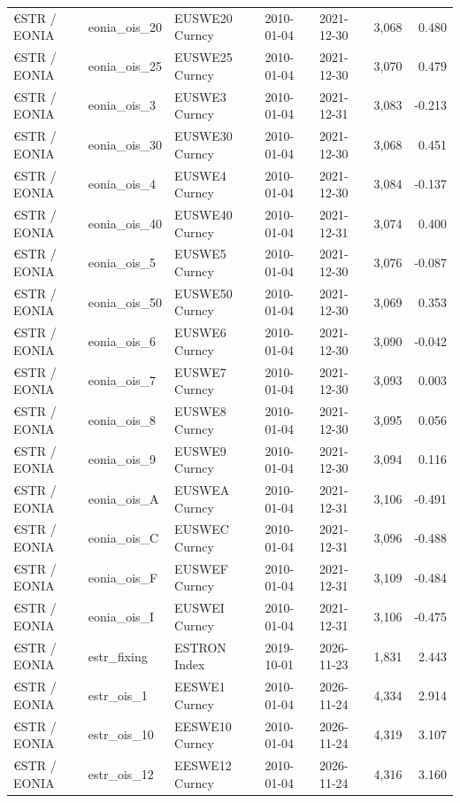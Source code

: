 \documentclass[10pt,a4paper]{article}
\begin{document}
{\begin{longtable}{lllllrr}
€STR / EONIA & eonia\_ois\_20 & EUSWE20 Curncy & 2010-01-04 & 2021-12-30 & 3,068 & 0.480 \\
€STR / EONIA & eonia\_ois\_25 & EUSWE25 Curncy & 2010-01-04 & 2021-12-30 & 3,070 & 0.479 \\
€STR / EONIA & eonia\_ois\_3 & EUSWE3 Curncy & 2010-01-04 & 2021-12-31 & 3,083 & -0.213 \\
€STR / EONIA & eonia\_ois\_30 & EUSWE30 Curncy & 2010-01-04 & 2021-12-30 & 3,068 & 0.451 \\
€STR / EONIA & eonia\_ois\_4 & EUSWE4 Curncy & 2010-01-04 & 2021-12-30 & 3,084 & -0.137 \\
€STR / EONIA & eonia\_ois\_40 & EUSWE40 Curncy & 2010-01-04 & 2021-12-31 & 3,074 & 0.400 \\
€STR / EONIA & eonia\_ois\_5 & EUSWE5 Curncy & 2010-01-04 & 2021-12-30 & 3,076 & -0.087 \\
€STR / EONIA & eonia\_ois\_50 & EUSWE50 Curncy & 2010-01-04 & 2021-12-30 & 3,069 & 0.353 \\
€STR / EONIA & eonia\_ois\_6 & EUSWE6 Curncy & 2010-01-04 & 2021-12-30 & 3,090 & -0.042 \\
€STR / EONIA & eonia\_ois\_7 & EUSWE7 Curncy & 2010-01-04 & 2021-12-30 & 3,093 & 0.003 \\
€STR / EONIA & eonia\_ois\_8 & EUSWE8 Curncy & 2010-01-04 & 2021-12-30 & 3,095 & 0.056 \\
€STR / EONIA & eonia\_ois\_9 & EUSWE9 Curncy & 2010-01-04 & 2021-12-30 & 3,094 & 0.116 \\
€STR / EONIA & eonia\_ois\_A & EUSWEA Curncy & 2010-01-04 & 2021-12-31 & 3,106 & -0.491 \\
€STR / EONIA & eonia\_ois\_C & EUSWEC Curncy & 2010-01-04 & 2021-12-31 & 3,096 & -0.488 \\
€STR / EONIA & eonia\_ois\_F & EUSWEF Curncy & 2010-01-04 & 2021-12-31 & 3,109 & -0.484 \\
€STR / EONIA & eonia\_ois\_I & EUSWEI Curncy & 2010-01-04 & 2021-12-31 & 3,106 & -0.475 \\
€STR / EONIA & estr\_fixing & ESTRON Index & 2019-10-01 & 2026-11-23 & 1,831 & 2.443 \\
€STR / EONIA & estr\_ois\_1 & EESWE1 Curncy & 2010-01-04 & 2026-11-24 & 4,334 & 2.914 \\
€STR / EONIA & estr\_ois\_10 & EESWE10 Curncy & 2010-01-04 & 2026-11-24 & 4,319 & 3.107 \\
€STR / EONIA & estr\_ois\_12 & EESWE12 Curncy & 2010-01-04 & 2026-11-24 & 4,316 & 3.160 \\

\end{longtable}}
\end{document}
